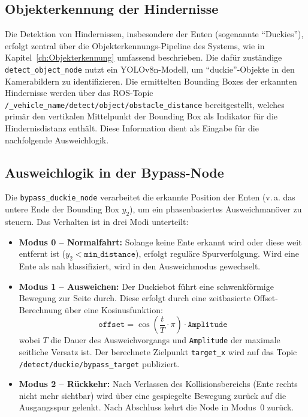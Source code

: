 \subsection{Objekterkennung der Hindernisse}
Die Detektion von Hindernissen, insbesondere der Enten (sogenannte \enquote{Duckies}), erfolgt zentral über die Objekterkennungs-Pipeline des Systems, wie in Kapitel~\ref{ch:Objekterkennung} umfassend beschrieben. Die dafür zuständige \texttt{detect\_object\_node} nutzt ein YOLOv8n-Modell, um \enquote{duckie}-Objekte in den Kamerabildern zu identifizieren. Die ermittelten Bounding Boxes der erkannten Hindernisse werden über das \ac{ROS}-Topic \texttt{/{\_vehicle\_name}/detect/object/obstacle\_distance} bereitgestellt, welches primär den vertikalen Mittelpunkt der Bounding Box als Indikator für die Hindernisdistanz enthält. Diese Information dient als Eingabe für die nachfolgende Ausweichlogik.

\subsection{Ausweichlogik in der Bypass-Node}
Die \texttt{bypass\_duckie\_node} verarbeitet die erkannte Position der Enten (v.\,a. das untere Ende der Bounding Box $y_2$), um ein phasenbasiertes Ausweichmanöver zu steuern. Das Verhalten ist in drei Modi unterteilt:

\begin{itemize}
    \item \textbf{Modus 0 – Normalfahrt:} Solange keine Ente erkannt wird oder diese weit entfernt ist ($y_2 < \texttt{min\_distance}$), erfolgt reguläre Spurverfolgung. Wird eine Ente als nah klassifiziert, wird in den Ausweichmodus gewechselt.
    
    \item \textbf{Modus 1 – Ausweichen:} Der Duckiebot führt eine schwenkförmige Bewegung zur Seite durch. Diese erfolgt durch eine zeitbasierte Offset-Berechnung über eine Kosinusfunktion:
    \begin{equation}
        \texttt{offset} = \cos\left( \frac{t}{T} \cdot \pi \right) \cdot \texttt{Amplitude}
    \end{equation}
    wobei $T$ die Dauer des Ausweichvorgangs und \texttt{Amplitude} der maximale seitliche Versatz ist. Der berechnete Zielpunkt \texttt{target\_x} wird auf das Topic \texttt{/detect/duckie/bypass\_target} publiziert.

    \item \textbf{Modus 2 – Rückkehr:} Nach Verlassen des Kollisionsbereichs (Ente rechts nicht mehr sichtbar) wird über eine gespiegelte Bewegung zurück auf die Ausgangsspur gelenkt. Nach Abschluss kehrt die Node in Modus~0 zurück.
\end{itemize}

